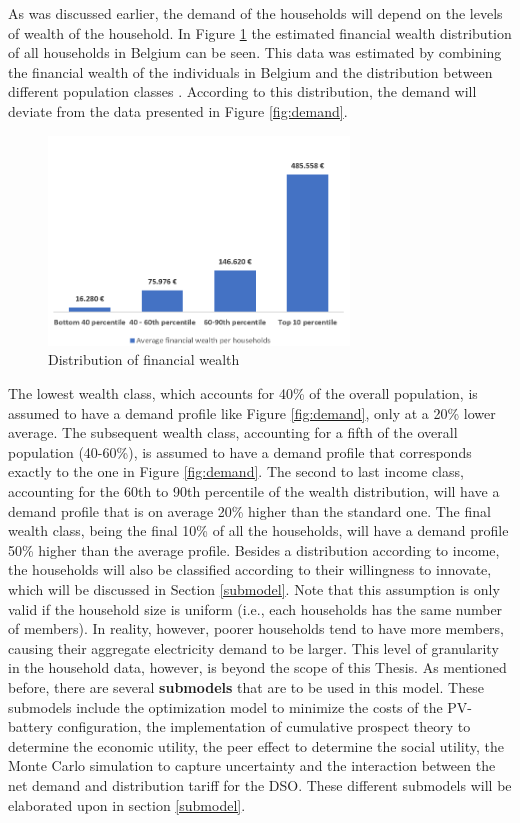 \newline \newline \noindent
As was discussed earlier, the demand of the households will depend on the levels of wealth of the household. In Figure \ref{fig:wealth} the estimated financial wealth distribution of all households in Belgium can be seen. This data was estimated by combining the financial wealth of the individuals in Belgium and the distribution between different population classes \cite{wealthdata,wealthdata2}. According to this distribution, the demand will deviate from the data presented in Figure \ref{fig:demand}.
\begin{figure}[h!]
    \centering
    \includegraphics[width=8cm]{incomedist.PNG}
    \caption[Distribution of financial wealth]{Distribution of financial wealth \cite{wealthdata,wealthdata2}}
    \label{fig:wealth}
\end{figure}
\newline
The lowest wealth class, which accounts for 40\% of the overall population, is assumed to have a demand profile like Figure \ref{fig:demand}, only at a 20\% lower average. The subsequent wealth class, accounting for a fifth of the overall population (40-60\%), is assumed to have a demand profile that corresponds exactly to the one in Figure \ref{fig:demand}. The second to last income class, accounting for the 60th to 90th percentile of the wealth distribution, will have a demand profile that is on average 20\% higher than the standard one. The final wealth class, being the final 10\% of all the households, will have a demand profile 50\% higher than the average profile. Besides a distribution according to income, the households will also be classified according to their willingness to innovate, which will be discussed in Section \ref{submodel}. Note that this assumption is only valid if the household size is uniform (i.e., each households has the same number of members). In reality, however, poorer households tend to have more members, causing their aggregate electricity demand to be larger. This level of granularity in the household data, however, is beyond the scope of this Thesis.  
\newline \newline \noindent
As mentioned before, there are several \textbf{submodels} that are to be used in this model. These submodels include the optimization model to minimize the costs of the PV-battery configuration, the implementation of cumulative prospect theory to determine the economic utility, the peer effect to determine the social utility, the Monte Carlo simulation to capture uncertainty and the interaction between the net demand and distribution tariff for the DSO. These different submodels will be elaborated upon in section \ref{submodel}.  
